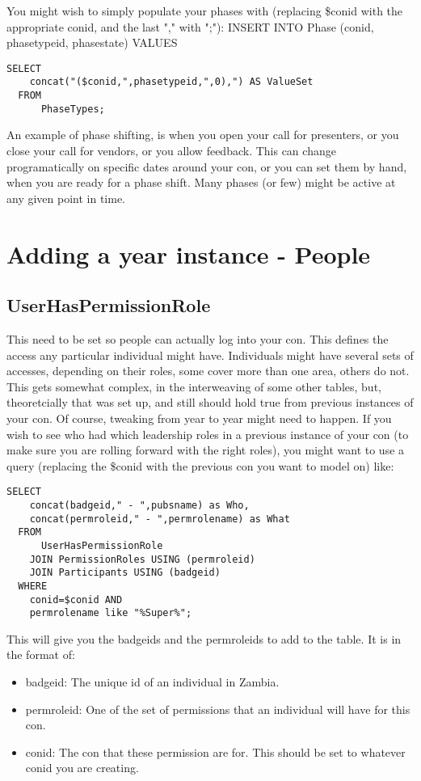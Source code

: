 \documentclass[captions=tablesignature]{scrartcl}
\begin{document}
You might wish to simply populate your phases with (replacing
\$conid with the appropriate conid, and the last "," with ";"):
INSERT INTO Phase (conid, phasetypeid, phasestate) VALUES
\begin{verbatim}
SELECT
    concat("($conid,",phasetypeid,",0),") AS ValueSet
  FROM
      PhaseTypes;
\end{verbatim}

An example of phase shifting, is when you open your call for
presenters, or you close your call for vendors, or you allow
feedback.  This can change programatically on specific dates around
your con, or you can set them by hand, when you are ready for a
phase shift.  Many phases (or few) might be active at any given
point in time.

\section{Adding a year instance - People}
\label{sec-12}
\subsection{UserHasPermissionRole}
\label{sec-12-1}
This need to be set so people can actually log into your con.  This
defines the access any particular individual might have.
Individuals might have several sets of accesses, depending on their
roles, some cover more than one area, others do not.  This gets
somewhat complex, in the interweaving of some other tables, but,
theoretcially that was set up, and still should hold true from
previous instances of your con.  Of course, tweaking from year to
year might need to happen.  If you wish to see who had which
leadership roles in a previous instance of your con (to make sure
you are rolling forward with the right roles), you might want to
use a query (replacing the \$conid with the previous con you want to
model on) like:
\begin{verbatim}
SELECT
    concat(badgeid," - ",pubsname) as Who,
    concat(permroleid," - ",permrolename) as What
  FROM
      UserHasPermissionRole
    JOIN PermissionRoles USING (permroleid)
    JOIN Participants USING (badgeid)
  WHERE
    conid=$conid AND
    permrolename like "%Super%";
\end{verbatim}
This will give you the badgeids and the permroleids to add to the
table.  It is in the format of:
\begin{itemize}
\item badgeid: The unique id of an individual in Zambia.
\item permroleid: One of the set of permissions that an individual will
have for this con.
\item conid: The con that these permission are for.  This should be set
to whatever conid you are creating.
\end{itemize}
\end{document}
